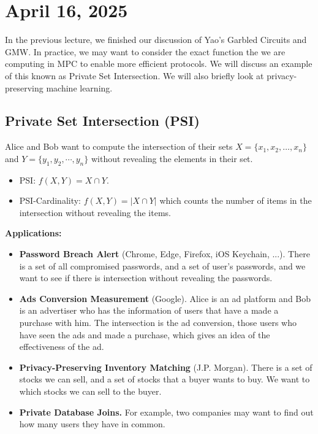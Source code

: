 \section{April 16, 2025}
\label{20250416}

In the previous lecture, we finished our discussion of Yao's Garbled Circuits and GMW. In practice, we may want to consider the exact function the we are computing in MPC to enable more efficient protocols. We will discuss an example of this known as Private Set Intersection. We will also briefly look at privacy-preserving machine learning.

\subsection{Private Set Intersection (PSI)}

Alice and Bob want to compute the intersection of their sets $X = \{x_1, x_2, \dots, x_n\}$ and $Y = \{y_1, y_2, \cdots, y_n\}$ without revealing the elements in their set.

\begin{itemize}
    \item PSI: $f(X, Y) = X\cap Y$.
    \item PSI-Cardinality: $f(X, Y) = |X\cap Y|$ which counts the number of items in the intersection without revealing the items.
\end{itemize}

\textbf{Applications:}
\begin{itemize}
    \item \textbf{Password Breach Alert} (Chrome, Edge, Firefox, iOS Keychain, ...). There is a set of all compromised passwords, and a set of user's passwords, and we want to see if there is intersection without revealing the passwords.
    \item \textbf{Ads Conversion Measurement} (Google). Alice is an ad platform and Bob is an advertiser who has the information of users that have a made a purchase with him. The intersection is the ad conversion, those users who have seen the ads and made a purchase, which gives an idea of the effectiveness of the ad.
    \item \textbf{Privacy-Preserving Inventory Matching} (J.P. Morgan). There is a set of stocks we can sell, and a set of stocks that a buyer wants to buy. We want to which stocks we can sell to the buyer.
    \item \textbf{Private Database Joins.} For example, two companies may want to find out how many users they have in common.
\end{itemize}

